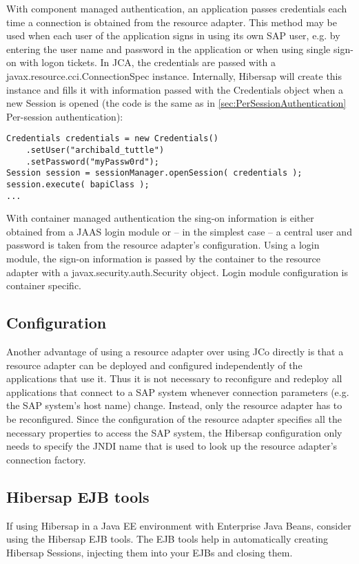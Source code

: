 With component managed authentication, an application passes credentials each time a connection is obtained from the resource adapter. This method may be used when each user of the application signs in using its own SAP user, e.g. by entering the user name and password in the application or when using single sign-on with logon tickets. In JCA, the credentials are passed with a javax.resource.cci.ConnectionSpec instance. Internally, Hibersap will create this instance and fills it with information passed with the Credentials object when a new Session is opened (the code is the same as in \ref{sec:PerSessionAuthentication} Per-session authentication): 

\begin{lstlisting}[caption=Component managed authentication]
Credentials credentials = new Credentials()
    .setUser("archibald_tuttle")
    .setPassword("myPassw0rd");
Session session = sessionManager.openSession( credentials );
session.execute( bapiClass );
...
\end{lstlisting}

With container managed authentication the sing-on information is either obtained from a JAAS login module or -- in the simplest case -- a central user and password is taken from the resource adapter's configuration. Using a login module, the sign-on information is passed by the container to the resource adapter with a javax.security.auth.Security object. Login module configuration is container specific.

\subsection{Configuration}
Another advantage of using a resource adapter over using JCo directly is that a resource adapter can be deployed and configured independently of the applications that use it. Thus it is not necessary to reconfigure and redeploy all applications that connect to a SAP system whenever connection parameters (e.g. the SAP system's host name) change. 
Instead, only the resource adapter has to be reconfigured. Since the configuration of the resource adapter specifies 
all the necessary properties to access the SAP system, the Hibersap configuration only needs to specify the JNDI name that is used to look up the resource adapter's connection factory. 

\subsection{Hibersap EJB tools}
\label{sec:HibersapEjbTools}
If using Hibersap in a Java EE environment with Enterprise Java Beans, consider using the Hibersap EJB tools. The EJB tools help in automatically creating Hibersap Sessions, injecting them into your EJBs and closing them. 

